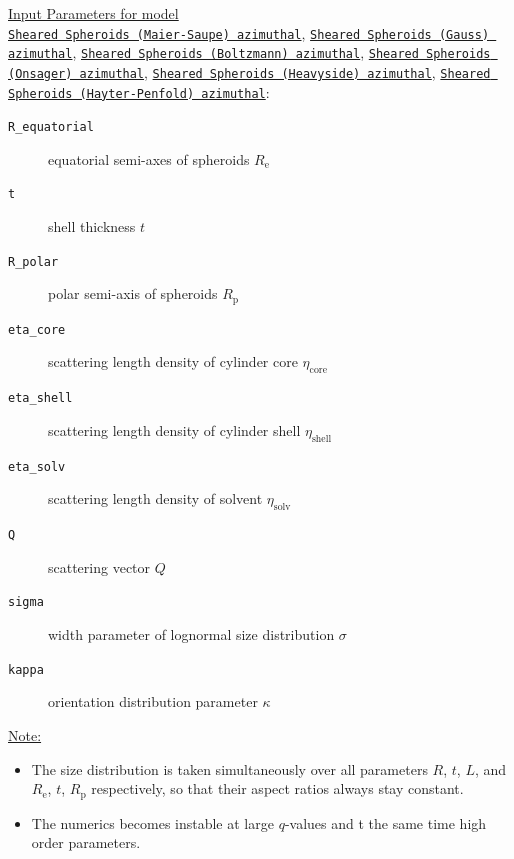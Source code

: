 \uline{Input Parameters for model}\\ \uline{\texttt{Sheared Spheroids (Maier-Saupe) azimuthal}}, \uline{\texttt{Sheared Spheroids (Gauss) azimuthal}}, \uline{\texttt{Sheared Spheroids (Boltzmann) azimuthal}}, \uline{\texttt{Sheared Spheroids (Onsager) azimuthal}}, \uline{\texttt{Sheared Spheroids (Heavyside) azimuthal}}, \uline{\texttt{Sheared Spheroids (Hayter-Penfold) azimuthal}}:\\
\begin{description}
\item[\texttt{R\_equatorial}] equatorial semi-axes of spheroids $R_\mathrm{e}$
\item[\texttt{t}] shell thickness $t$
\item[\texttt{R\_polar}] polar semi-axis of spheroids $R_\mathrm{p}$
\item[\texttt{eta\_core}] scattering length density of cylinder core $\eta_\mathrm{core}$
\item[\texttt{eta\_shell}] scattering length density of cylinder shell $\eta_\mathrm{shell}$
\item[\texttt{eta\_solv}] scattering length density of solvent $\eta_\mathrm{solv}$
\item[\texttt{Q}] scattering vector $Q$
\item[{\texttt{sigma}}] width parameter of lognormal size distribution $\sigma$
\item[{\texttt{kappa}}] orientation distribution parameter $\kappa$
\end{description}

\vspace{5mm}

\noindent \uline{Note:}
\begin{itemize}
\item The size distribution is taken simultaneously over all parameters $R$, $t$, $L$, and $R_\mathrm{e}$, $t$, $R_\mathrm{p}$ respectively, so that their aspect ratios always stay constant.
\item The numerics becomes instable at large $q$-values and t the same time high order parameters.
\end{itemize}
